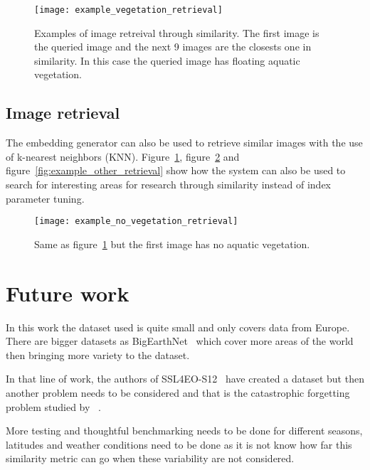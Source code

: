 \documentclass[conference]{IEEEtran}
\begin{document}
    \begin{figure}[b]
        \centering
        \texttt{[image: example\_vegetation\_retrieval]}
        \caption{Examples of image retreival through similarity. The first image is the queried image and the next 9 images are the closests one in similarity.
        In this case the queried image has floating aquatic vegetation.}
        \label{fig:example_vegetation_retrieval}
    \end{figure}

    \subsection{Image retrieval}
    The embedding generator can also be used to retrieve similar images with the use of k-nearest neighbors (KNN).
    Figure~\ref{fig:example_vegetation_retrieval}, figure~\ref{fig:example_no_vegetation_retrieval} and figure~\ref{fig:example_other_retrieval} show how the system can also
    be used to search for interesting areas for research through similarity instead of index parameter tuning.



    \begin{figure}[b]
        \centering
        \texttt{[image: example\_no\_vegetation\_retrieval]}
        \caption{Same as figure~\ref{fig:example_vegetation_retrieval} but the first image has no aquatic vegetation.}
        \label{fig:example_no_vegetation_retrieval}
    \end{figure}


    \section{Future work}
    In this work the dataset used is quite small and only covers data from Europe.
    There are bigger datasets as BigEarthNet~\cite{bigearthnet} which cover more areas of the world then bringing more variety to the dataset.

    In that line of work, the authors of SSL4EO-S12~\cite{wang2023ssl4eos12} have created a dataset but then another problem needs to be considered
    and that is the catastrophic forgetting problem studied by ~\citet{kirkpatrick2017overcoming, de2021continual, 10135093, purushwalkam2022challenges}.

    More testing and thoughtful benchmarking needs to be done for different seasons, latitudes and weather conditions need to be done as it is not know
    how far this similarity metric can go when these variability are not considered.
\end{document}
